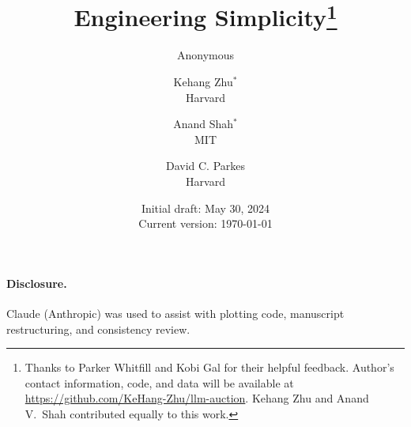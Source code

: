 \documentclass{article}
\title{Engineering Simplicity\ifanon\else\thanks{
  \footnotesize
 Thanks to Parker Whitfill and Kobi Gal for their helpful feedback. Author's contact information, code, and data will be available at \url{https://github.com/KeHang-Zhu/llm-auction}. Kehang Zhu and Anand V.\ Shah contributed equally to this work.
}\fi}
\author{Anonymous}
\author{
  Kehang Zhu$^{*}$\\
  Harvard \\
  \and
  Anand Shah$^{*}$\\
  MIT \\
  \and
  David C. Parkes \\
  Harvard \\
}
\date{
Initial draft: May 30, 2024 \\
Current version: \today
}
\newif\ifanon
\begin{document}
\maketitle



\newpage
{\setcounter{tocdepth}{2}\small\tableofcontents}
\newpage








\ifanon
\paragraph{Disclosure.} An AI assistant was used to assist with plotting code, manuscript restructuring, and consistency review; details withheld for anonymous review.
\else
\paragraph{Disclosure.} Claude (Anthropic) was used to assist with plotting code, manuscript restructuring, and consistency review.
\fi

\clearpage



\clearpage
\appendix











\end{document}
